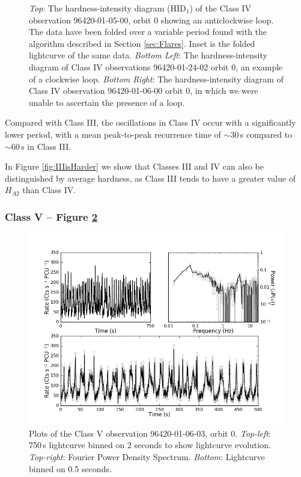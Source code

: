 \begin{figure}
    \captionsetup{singlelinecheck=off}
    \caption{\textit{Top}: The hardness-intensity diagram (HID$_1$) of the Class IV observation 96420-01-05-00, orbit 0 showing an anticlockwise loop.  The data have been folded over a variable period found with the algorithm described in Section \ref{sec:Flares}.  Inset is the folded lightcurve of the same data.  \textit{Bottom Left}: The hardness-intensity diagram of Class IV observations 96420-01-24-02 orbit 0, an example of a clockwise loop.  \textit{Bottom Right}: The hardness-intensity diagram of Class IV observation 96420-01-06-00 orbit 0, in which we were unable to ascertain the presence of a loop.}
   \label{fig:LoopIV}
\end{figure}

\par Compared with Class III, the oscillations in Class IV occur with a significantly lower period, with a mean peak-to-peak recurrence time of $\sim30$\,s compared to $\sim60$\,s in Class III.
\par In Figure \ref{fig:IIIisHarder} we show that Classes III and IV can also be distinguished by average hardness, as Class III tends to have a greater value of $H_{A2}$ than Class IV.

\subsubsection{Class V -- Figure \ref{fig:Kmulti}}
\label{sec:classV}

\begin{figure}
    \includegraphics[width=0.8\columnwidth, trim = 0.6cm 0 3.9cm 0]{images/Kmulti.png}
    \captionsetup{singlelinecheck=off}
    \caption{Plots of the Class V observation 96420-01-06-03, orbit 0.  \textit{Top-left}: 750\,s lightcurve binned on 2 seconds to show lightcurve evolution.  \textit{Top-right}: Fourier Power Density Spectrum. \textit{Bottom}: Lightcurve binned on 0.5 seconds.}
   \label{fig:Kmulti}
\end{figure}

